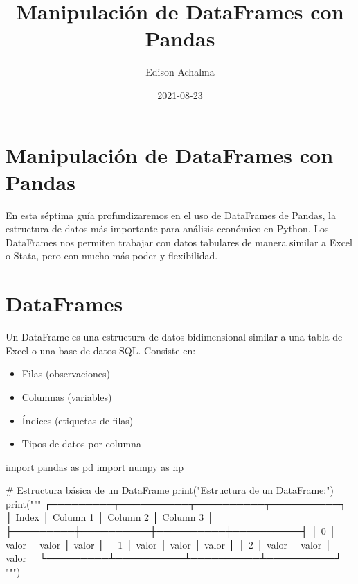 \documentclass[
  doc,
  floatsintext,
  longtable,
  a4paper,
  nolmodern,
  notxfonts,
  notimes,
  12pt,
  colorlinks=true,linkcolor=blue,citecolor=blue,urlcolor=blue]{apa7}
\title{Manipulación de DataFrames con Pandas}
\author{Edison Achalma}
\affiliation{
{Escuela Profesional de Economía, Universidad Nacional de San Cristóbal
de Huamanga}}
\date{2021-08-23}
\newenvironment{Shaded}{\begin{snugshade}}{\end{snugshade}}
\newcommand{\BuiltInTok}[1]{\textcolor[rgb]{0.00,0.23,0.31}{#1}}
\newcommand{\CommentTok}[1]{\textcolor[rgb]{0.37,0.37,0.37}{#1}}
\newcommand{\ImportTok}[1]{\textcolor[rgb]{0.00,0.46,0.62}{#1}}
\newcommand{\NormalTok}[1]{\textcolor[rgb]{0.00,0.23,0.31}{#1}}
\newcommand{\StringTok}[1]{\textcolor[rgb]{0.13,0.47,0.30}{#1}}
\providecommand{\tightlist}{%
  \setlength{\itemsep}{0pt}\setlength{\parskip}{0pt}}
\begin{document}
\maketitle


\hypertarget{toc}{}
\tableofcontents
\newpage
\section[Introduction]{Manipulación de DataFrames con Pandas}

\setcounter{secnumdepth}{3}

\setlength\LTleft{0pt}




En esta séptima guía profundizaremos en el uso de DataFrames de Pandas,
la estructura de datos más importante para análisis económico en Python.
Los DataFrames nos permiten trabajar con datos tabulares de manera
similar a Excel o Stata, pero con mucho más poder y flexibilidad.

\section{DataFrames}\label{dataframes}

Un DataFrame es una estructura de datos bidimensional similar a una
tabla de Excel o una base de datos SQL. Consiste en:

\begin{itemize}
\tightlist
\item
  Filas (observaciones)
\item
  Columnas (variables)
\item
  Índices (etiquetas de filas)
\item
  Tipos de datos por columna
\end{itemize}

\begin{Shaded}
\begin{Highlighting}[]
\ImportTok{import}\NormalTok{ pandas }\ImportTok{as}\NormalTok{ pd}
\ImportTok{import}\NormalTok{ numpy }\ImportTok{as}\NormalTok{ np}

\CommentTok{\# Estructura básica de un DataFrame}
\BuiltInTok{print}\NormalTok{(}\StringTok{"Estructura de un DataFrame:"}\NormalTok{)}
\BuiltInTok{print}\NormalTok{(}\StringTok{"""}
\StringTok{    ┌─────────┬──────────┬──────────┬──────────┐}
\StringTok{    │ Index   │ Column 1 │ Column 2 │ Column 3 │}
\StringTok{    ├─────────┼──────────┼──────────┼──────────┤}
\StringTok{    │ 0       │ valor    │ valor    │ valor    │}
\StringTok{    │ 1       │ valor    │ valor    │ valor    │}
\StringTok{    │ 2       │ valor    │ valor    │ valor    │}
\StringTok{    └─────────┴──────────┴──────────┴──────────┘}
\StringTok{"""}\NormalTok{)}
\end{Highlighting}
\end{Shaded}
\end{document}
